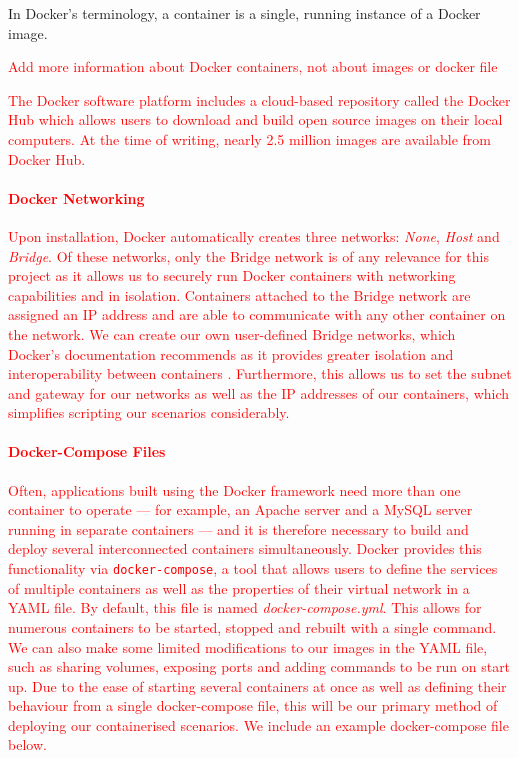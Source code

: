 \documentclass[sigconf,anonymous]{acmart}\usepackage[]{graphicx}\usepackage[]{color}
\begin{document}
In Docker's terminology, a container is a single, running instance of a Docker image. 
\textcolor{red}{Add more information about Docker containers, not about images or docker file

The Docker software platform includes a cloud-based repository called the Docker Hub \cite{dockerhub} which allows users to download and build open source images on their local computers. At the time of writing, nearly 2.5 million images are available from Docker Hub. 

\paragraph*{Docker Networking} 

Upon installation, Docker automatically creates three networks: \textit{None}, \textit{Host} and \textit{Bridge}. Of these networks, only the Bridge network is of any relevance for this project as it allows us to securely run Docker containers with networking capabilities and in isolation. Containers attached to the Bridge network are assigned an IP address and are able to communicate with any other container on the network. We can create our own user-defined Bridge networks, which Docker's documentation recommends as it provides greater isolation and interoperability between containers \cite{docker_docs}. Furthermore, this allows us to set the subnet and gateway for our networks as well as the IP addresses of our containers, which simplifies scripting our scenarios considerably.


\paragraph*{Docker-Compose Files}

   Often, applications built using the Docker framework need more than one container to operate --- for example, an Apache server and a MySQL server running in separate containers --- and it is therefore necessary to build and deploy several interconnected containers simultaneously. Docker provides this functionality via \texttt{docker-compose}, a tool that allows users to define the services of multiple containers as well as the properties of their virtual network in a YAML file. By default, this file is named \textit{docker-compose.yml}. This allows for numerous containers to be started, stopped and rebuilt with a single command. We can also make some limited modifications to our images in the YAML file, such as sharing volumes, exposing ports and adding commands to be run on start up. Due to the ease of starting several containers at once as well as defining their behaviour from a single docker-compose file, this will be our primary method of deploying our containerised scenarios. We include an example docker-compose file below.
   
}
\end{document}
